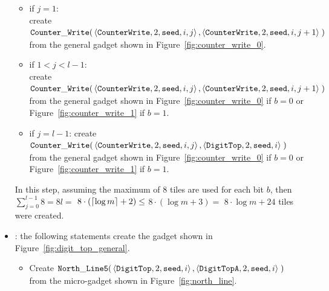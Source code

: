 \begin{itemize}
\begin{itemize}
        \item if $j = 1$:\\ create
        $\begin{aligned}[t]
            \cwrite(&\left\langle {\tt CounterWrite}, 2, {\tt seed}, i, j \right\rangle, \left\langle {\tt CounterWrite}, 2, {\tt seed}, i, j + 1 \right\rangle \;)
        \end{aligned}$\\from the general gadget shown in Figure~\ref{fig:counter_write_0}.

        \item if $1 < j < l-1$:\\ create
        $\begin{aligned}[t]
            \cwrite(&\left\langle {\tt CounterWrite}, 2, {\tt seed}, i, j \right\rangle, \left\langle {\tt CounterWrite}, 2, {\tt seed}, i, j + 1 \right\rangle \;)
        \end{aligned}$\\from the general gadget shown in Figure~\ref{fig:counter_write_0} if $b = 0$ or Figure~\ref{fig:counter_write_1} if $b = 1$.

        \item if $j = l-1$: create
        $\begin{aligned}[t]
            \cwrite(&\left\langle {\tt CounterWrite}, 2, {\tt seed}, i, j \right\rangle, \left\langle {\tt DigitTop}, 2, {\tt seed}, i \right\rangle \;)
        \end{aligned}$\\from the general gadget shown in Figure~\ref{fig:counter_write_0} if $b = 0$ or Figure~\ref{fig:counter_write_1} if $b = 1$.
    \end{itemize}
    In this step, assuming the maximum of 8 tiles are used for each bit $b$, then
    $\sum^{l-1}_{j=0} 8 = 8l =$
    $8 \cdot \left( \ceil*{\log m} + 2 \right) \leq$
    $8 \cdot \left( {\log m} + 3 \right) =$
    $8 \cdot {\log m} + 24$ tiles were created.

    \item {\dtop}: the following statements create the gadget shown in Figure~\ref{fig:digit_top_general}.
    \begin{itemize}
        \item Create
        $\begin{aligned}[t]
            {\tt North\_Line5}(& \left \langle {\tt DigitTop},  2, {\tt seed}, i \right\rangle,
                                 \left \langle {\tt DigitTopA}, 2, {\tt seed}, i \right\rangle \;)
        \end{aligned}$\\ from the micro-gadget shown in Figure~\ref{fig:north_line}.


\end{itemize}
\end{itemize}

